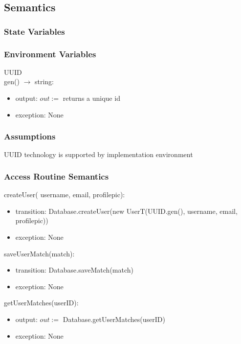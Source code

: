 \documentclass[12pt, titlepage]{article}
\begin{document}
\subsection{Semantics}

\subsubsection{State Variables}

\subsubsection{Environment Variables}

UUID\\
gen() $\rightarrow$ string:
\begin{itemize}
    \item output: $out := $ returns a unique id
    \item exception:    None
\end{itemize}

\subsubsection{Assumptions}

UUID technology is supported by implementation environment

\subsubsection{Access Routine Semantics}

\noindent createUser( username, email, profilepic):
\begin{itemize}
\item transition: Database.createUser(new UserT(UUID.gen(), username, email, profilepic))
\item exception: None
\end{itemize}

\noindent saveUserMatch(match):
\begin{itemize}
\item transition: Database.saveMatch(match) 
\item exception: None
\end{itemize}

\noindent getUserMatches(userID): 
\begin{itemize}
\item output: $out := $ Database.getUserMatches(userID)
\item exception: None
\end{itemize}
\end{document}
